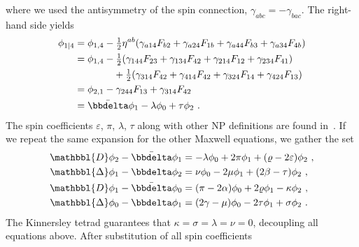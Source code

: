 where we used the antisymmetry of the spin connection, $\gamma_{abc}=-\gamma_{bac}$. The right-hand side yields
\begin{align}
    \begin{split}
        \phi_{1\rvert 4} &= \phi_{1, 4} - \tfrac{1}{2} \eta^{ab}( \gamma_{a14} F_{b2} + \gamma_{a24} F_{1b} + \gamma_{a44} F_{b3} + \gamma_{a34} F_{4b} ) \\
        &= \phi_{1, 4} - \tfrac{1}{2} ( \gamma_{144} F_{23} + \gamma_{134} F_{42} + \gamma_{214} F_{12} + \gamma_{234} F_{41} ) \\ 
        &\qquad\qquad + \tfrac{1}{2} ( \gamma_{314} F_{42} + \gamma_{414} F_{42} + \gamma_{324} F_{14} + \gamma_{424} F_{13} ) \\
        &= \phi_{2, 1} - \gamma_{244} F_{13} + \gamma_{314} F_{42} \\
        &= \bar{\bbdelta} \phi_1 - \lambda \phi_0 + \tau \phi_2  ~.
    \end{split}
    \label{eq3:phi21SpinCoef}
\end{align}
The spin coefficients $\varepsilon$, $\pi$, $\lambda$, $\tau$ along with other NP definitions are found in~. If we repeat the same expansion for the other Maxwell equations, we gather the set
\begin{subequations}
    \begin{align}
        \label{eq3:phi21phi14SpinCoef}
        \mathbbl{D} \phi_2 - \bar{\bbdelta} \phi_1 &= -\lambda \phi_0 + 2 \pi \phi_1 + (\varrho - 2 \varepsilon) \phi_2 ~,\\
        \label{eq3:phi12phi23SpinCoef}
        \mathbbl{\Delta} \phi_1 - \bbdelta \phi_2 &= \nu \phi_0 - 2 \mu \phi_1 + (2\beta-\tau) \phi_2 ~,\\
        \label{eq3:phi11phi04SpinCoef}
        \mathbbl{D} \phi_1 - \bar{\bbdelta} \phi_0 &= (\pi - 2 \alpha) \phi_0 + 2 \varrho \phi_1 - \kappa \phi_2 ~,\\
        \label{eq3:phi02phi13SpinCoef}
        \mathbbl{\Delta} \phi_0 - \bbdelta \phi_1 &= (2 \gamma - \mu) \phi_0 - 2 \tau \phi_1 + \sigma \phi_2 ~.
    \end{align}
\end{subequations}
The Kinnersley tetrad guarantees that $\kappa = \sigma = \lambda = \nu = 0$, decoupling all equations above. After substitution of all spin coefficients
